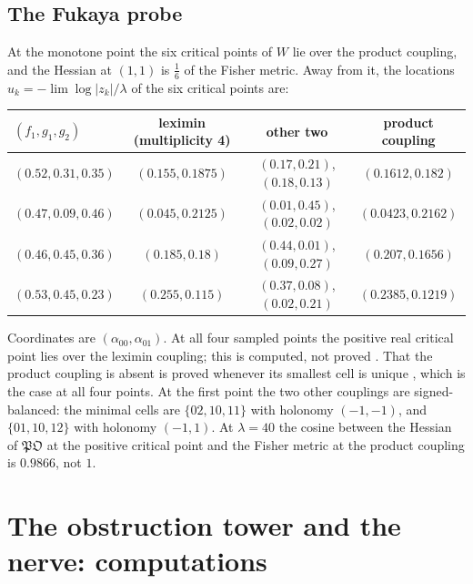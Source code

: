 \documentclass[11pt]{article}
\theoremstyle{definition}
\theoremstyle{remark}
\begin{document}
\subsection{The Fukaya probe}\label{sec:openfuk}
At the monotone point the six critical points of $W$ lie over the product coupling, and the Hessian at $(1,1)$ is
$\frac16$ of the Fisher metric. Away from it, the locations $u_k=-\lim\log\lvert z_k\rvert/\lambda$ of the six critical
points are:
\begin{center}\small
\begin{tabular}{@{}lccc@{}}
\toprule
$(f_1,g_1,g_2)$ & leximin (multiplicity 4) & other two & product coupling\\
\midrule
$(0.52,0.31,0.35)$ & $(0.155,0.1875)$ & $(0.17,0.21)$, $(0.18,0.13)$ & $(0.1612,0.182)$\\
$(0.47,0.09,0.46)$ & $(0.045,0.2125)$ & $(0.01,0.45)$, $(0.02,0.02)$ & $(0.0423,0.2162)$\\
$(0.46,0.45,0.36)$ & $(0.185,0.18)$ & $(0.44,0.01)$, $(0.09,0.27)$ & $(0.207,0.1656)$\\
$(0.53,0.45,0.23)$ & $(0.255,0.115)$ & $(0.37,0.08)$, $(0.02,0.21)$ & $(0.2385,0.1219)$\\
\bottomrule
\end{tabular}
\end{center}
Coordinates are $(\alpha_{00},\alpha_{01})$. At all four sampled points the positive real critical point lies over the
leximin coupling; this is computed, not proved \cite[Obs.~10.10]{Conditionals}. That the product coupling is absent is
proved whenever its smallest cell is unique \cite[Prop.~10.11]{Conditionals}, which is the case at all four points. At the
first point the two other couplings are signed-balanced: the minimal cells are $\{02,10,11\}$ with holonomy $(-1,-1)$, and
$\{01,10,12\}$ with holonomy $(-1,1)$. At $\lambda=40$ the cosine between the Hessian of $\mathfrak{PO}$ at the positive
critical point and the Fisher metric at the product coupling is $0.9866$, not $1$.

\section{The obstruction tower and the nerve: computations}\label{sec:towercomp}
\end{document}
